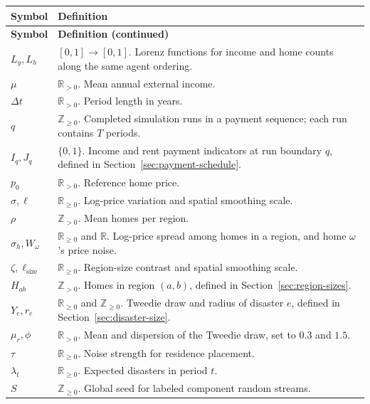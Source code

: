 \documentclass[10pt]{article}
\begin{document}
\begin{longtable}{@{}p{}>{\raggedright\arraybackslash}p{}@{}}
\toprule
\textbf{Symbol} & \textbf{Definition} \\
\midrule
\endfirsthead
\toprule
\textbf{Symbol} & \textbf{Definition (continued)} \\
\midrule
\endhead
\bottomrule
\endfoot
$L_y,L_h$ & $[0,1]\to[0,1]$. Lorenz functions for income and home counts along the same agent ordering. \\
$\mu$ & $\mathbb{R}_{>0}$. Mean annual external income. \\
$\Delta t$ & $\mathbb{R}_{>0}$. Period length in years. \\
$q$ & $\mathbb{Z}_{\geq0}$. Completed simulation runs in a payment sequence; each run contains $T$ periods. \\
$I_q,J_q$ & $\{0,1\}$. Income and rent payment indicators at run boundary $q$, defined in Section~\ref{sec:payment-schedule}. \\
$p_0$ & $\mathbb{R}_{>0}$. Reference home price. \\
$\sigma,\ell$ & $\mathbb{R}_{\geq0}$. Log-price variation and spatial smoothing scale. \\
$\rho$ & $\mathbb{Z}_{>0}$. Mean homes per region. \\
$\sigma_h,W_\omega$ & $\mathbb{R}_{\geq0}$ and $\mathbb{R}$. Log-price spread among homes in a region, and home $\omega$'s price noise. \\
$\zeta,\ell_{\mathrm{size}}$ & $\mathbb{R}_{\geq0}$. Region-size contrast and spatial smoothing scale. \\
$H_{ab}$ & $\mathbb{Z}_{>0}$. Homes in region $(a,b)$, defined in Section~\ref{sec:region-sizes}. \\
$Y_e,r_e$ & $\mathbb{R}_{\geq0}$ and $\mathbb{Z}_{\geq0}$. Tweedie draw and radius of disaster $e$, defined in Section~\ref{sec:disaster-size}. \\
$\mu_r,\phi$ & $\mathbb{R}_{>0}$. Mean and dispersion of the Tweedie draw, set to $0.3$ and $1.5$. \\
$\tau$ & $\mathbb{R}_{\geq0}$. Noise strength for residence placement. \\
$\lambda_t$ & $\mathbb{R}_{\geq0}$. Expected disasters in period $t$. \\
$S$ & $\mathbb{Z}_{\geq0}$. Global seed for labeled component random streams. \\
\end{longtable}
\end{document}

